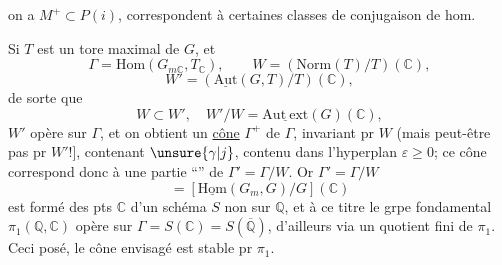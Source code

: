 on a $M^+\subset P(i)$,  correspondent à certaines classes de conjugaison de hom.

Si $T$ est un tore maximal de $G$, et
\[
\Gamma=\mathrm{Hom}(G_{m\mathbb{C}},T_{\mathbb{C}}),\qquad W=(\mathrm{Norm}(T)/T)(\mathbb{C}),
\]
\[
W'=(\underline{\mathrm{Aut}}(G,T)/T)(\mathbb{C}),
\]
de sorte que
\[
W\subset W',\quad W'/W=\underline{\mathrm{Aut\ ext}}(G)(\mathbb{C}),
\]
$W'$ opère sur $\Gamma$, et on obtient un \uline{cône}  $\Gamma^+$ de $\Gamma$, invariant pr $W$ (mais peut-être pas pr $W'$!], contenant $\unsure{\gamma|j}$, contenu dans l'hyperplan $\varepsilon\geq0$;
 ce cône correspond donc à une partie ``'' de $\Gamma'=\Gamma/W$. Or $\Gamma'=\Gamma/W$
\[
=[\underline{\mathrm{Hom}}(G_m,G)/G](\mathbb{C})
\]
est formé des pts   $\mathbb{C}$ d'un schéma  $S$ non  sur $\mathbb{Q}$, et à ce titre le grpe fondamental $\pi_1(\mathbb{Q},\mathbb{C})$ opère sur  $\Gamma=S(\mathbb{C})=S(\overline{\mathbb{Q}})$, d'ailleurs via un quotient fini de $\pi_1$. Ceci posé, le cône envisagé  est stable pr $\pi_1$.

